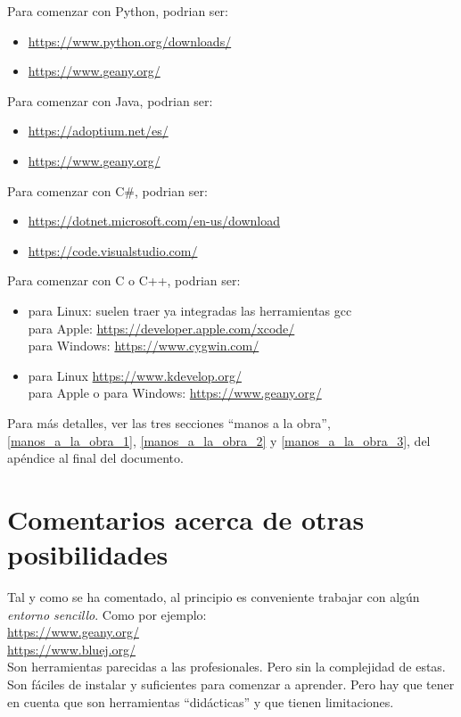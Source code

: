 \documentclass[spanish,12pt,a4paper,final,oneside]{book}
\begin{document}
Para comenzar con Python, podrian ser:
\begin{itemize}
\item \url{https://www.python.org/downloads/}
\item \url{https://www.geany.org/}
\end{itemize}

Para comenzar con Java, podrian ser:
\begin{itemize}
\item \url{https://adoptium.net/es/}
\item \url{https://www.geany.org/}
\end{itemize}

Para comenzar con C\#, podrian ser:
\begin{itemize}
\item \url{https://dotnet.microsoft.com/en-us/download}
\item \url{https://code.visualstudio.com/}
\end{itemize}

Para comenzar con C o C++, podrian ser:
\begin{itemize}
\item para Linux: suelen traer ya integradas las herramientas gcc
\\para Apple: \url{https://developer.apple.com/xcode/}
\\para Windows: \url{https://www.cygwin.com/}
\item para Linux \url{https://www.kdevelop.org/}
\\para Apple o para Windows: \url{https://www.geany.org/}
\end{itemize}

Para más detalles, ver las tres secciones ``manos a la obra'', \ref{manos_a_la_obra_1}, \ref{manos_a_la_obra_2} y \ref{manos_a_la_obra_3}, del apéndice al final del documento. 


\section{Comentarios acerca de otras posibilidades}
Tal y como se ha comentado, al principio es conveniente trabajar con algún \textit{entorno sencillo}. Como por ejemplo:
\\ \url{https://www.geany.org/}
\\ \url{https://www.bluej.org/}
\\Son herramientas parecidas a las  profesionales. Pero sin la complejidad de estas.
\\Son fáciles de instalar y suficientes para comenzar a aprender. Pero  hay que tener en cuenta que son herramientas ``didácticas'' y que tienen limitaciones.
\end{document}
